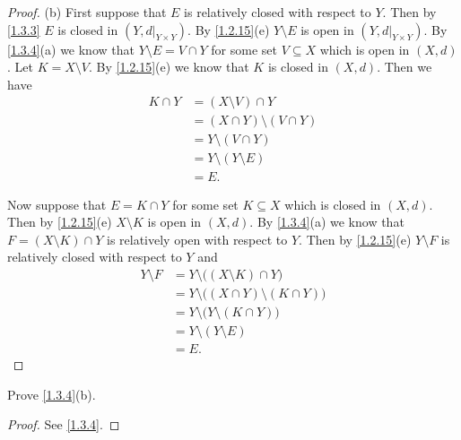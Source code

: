 \begin{proof}{(b)}
  First suppose that \(E\) is relatively closed with respect to \(Y\).
  Then by \cref{1.3.3} \(E\) is closed in \((Y, d|_{Y \times Y})\).
  By \cref{1.2.15}(e) \(Y \setminus E\) is open in \((Y, d|_{Y \times Y})\).
  By \cref{1.3.4}(a) we know that \(Y \setminus E = V \cap Y\) for some set \(V \subseteq X\) which is open in \((X, d)\).
  Let \(K = X \setminus V\).
  By \cref{1.2.15}(e) we know that \(K\) is closed in \((X, d)\).
  Then we have
  \begin{align*}
    K \cap Y & = (X \setminus V) \cap Y          \\
             & = (X \cap Y) \setminus (V \cap Y) \\
             & = Y \setminus (V \cap Y)          \\
             & = Y \setminus (Y \setminus E)     \\
             & = E.
  \end{align*}

  Now suppose that \(E = K \cap Y\) for some set \(K \subseteq X\) which is closed in \((X, d)\).
  Then by \cref{1.2.15}(e) \(X \setminus K\) is open in \((X, d)\).
  By \cref{1.3.4}(a) we know that \(F = (X \setminus K) \cap Y\) is relatively open with respect to \(Y\).
  Then by \cref{1.2.15}(e) \(Y \setminus F\) is relatively closed with respect to \(Y\) and
  \begin{align*}
    Y \setminus F & = Y \setminus \big((X \setminus K) \cap Y\big)          \\
                  & = Y \setminus \big((X \cap Y) \setminus (K \cap Y)\big) \\
                  & = Y \setminus \big(Y \setminus (K \cap Y)\big)          \\
                  & = Y \setminus (Y \setminus E)                           \\
                  & = E.
  \end{align*}
\end{proof}

\exercisesection

\begin{exercise}\label{ex 1.3.1}
  Prove \cref{1.3.4}(b).
\end{exercise}

\begin{proof}
  See \cref{1.3.4}.
\end{proof}